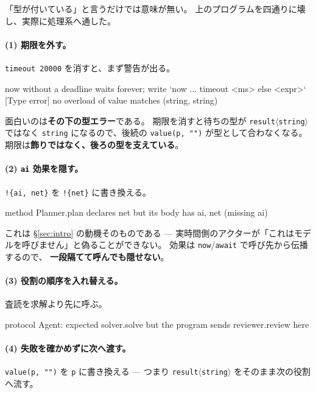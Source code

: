 \documentclass[11pt,a4paper]{ltjsarticle}
\theoremstyle{definition}
\theoremstyle{remark}
\begin{document}
「型が付いている」と言うだけでは意味が無い。
上のプログラムを四通りに壊し、実際に処理系へ通した。

\paragraph{(1) 期限を外す。}
\texttt{timeout 20000} を消すと、まず警告が出る。

\begin{term}
[warn] now without a deadline waits forever;
       write `now ... timeout <ms> else <expr>`
[Type error] no overload of value matches (string, string)
\end{term}

面白いのは\textbf{その下の型エラー}である。
期限を消すと待ちの型が \texttt{result}$\langle$\texttt{string}$\rangle$ ではなく
\texttt{string} になるので、後続の \texttt{value(p, "")} が型として合わなくなる。
期限は\textbf{飾りではなく、後ろの型を支えている}。

\paragraph{(2) \texttt{ai} 効果を隠す。}
\texttt{!\{ai, net\}} を \texttt{!\{net\}} に書き換える。

\begin{term}
 method Planner.plan declares {net} but its body has {ai, net}
             (missing {ai})
\end{term}

これは \S\ref{sec:intro} の動機そのものである ---
実時間側のアクターが「これはモデルを呼びません」と偽ることができない。
効果は \texttt{now}/\texttt{await} で呼び先から伝播するので、
\textbf{一段隔てて呼んでも隠せない}。

\paragraph{(3) 役割の順序を入れ替える。}
査読を求解より先に呼ぶ。

\begin{term}
 protocol Agent: expected solver.solve
             but the program sends reviewer.review here
\end{term}

\paragraph{(4) 失敗を確かめずに次へ渡す。}
\texttt{value(p, "")} を \texttt{p} に書き換える ---
つまり \texttt{result}$\langle$\texttt{string}$\rangle$ をそのまま次の役割へ流す。
\end{document}
